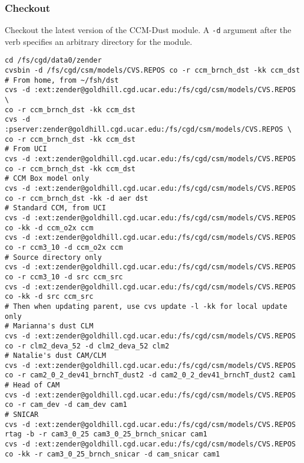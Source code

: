 \documentclass[12pt,twoside]{article}
\begin{document}
\subsubsection[Checkout]{Checkout}
Checkout the latest version of the CCM-Dust module. 
A \verb'-d' argument after the verb specifies an arbitrary directory
for the module.
\begin{verbatim}
cd /fs/cgd/data0/zender
cvsbin -d /fs/cgd/csm/models/CVS.REPOS co -r ccm_brnch_dst -kk ccm_dst
# From home, from ~/fsh/dst 
cvs -d :ext:zender@goldhill.cgd.ucar.edu:/fs/cgd/csm/models/CVS.REPOS \
co -r ccm_brnch_dst -kk ccm_dst
cvs -d :pserver:zender@goldhill.cgd.ucar.edu:/fs/cgd/csm/models/CVS.REPOS \ 
co -r ccm_brnch_dst -kk ccm_dst 
# From UCI
cvs -d :ext:zender@goldhill.cgd.ucar.edu:/fs/cgd/csm/models/CVS.REPOS co -r ccm_brnch_dst -kk ccm_dst 
# CCM Box model only
cvs -d :ext:zender@goldhill.cgd.ucar.edu:/fs/cgd/csm/models/CVS.REPOS co -r ccm_brnch_dst -kk -d aer dst
# Standard CCM, from UCI
cvs -d :ext:zender@goldhill.cgd.ucar.edu:/fs/cgd/csm/models/CVS.REPOS co -kk -d ccm_o2x ccm
cvs -d :ext:zender@goldhill.cgd.ucar.edu:/fs/cgd/csm/models/CVS.REPOS co -r ccm3_10 -d ccm_o2x ccm
# Source directory only 
cvs -d :ext:zender@goldhill.cgd.ucar.edu:/fs/cgd/csm/models/CVS.REPOS co -r ccm3_10 -d src ccm_src
cvs -d :ext:zender@goldhill.cgd.ucar.edu:/fs/cgd/csm/models/CVS.REPOS co -kk -d src ccm_src
# Then when updating parent, use cvs update -l -kk for local update only
# Marianna's dust CLM
cvs -d :ext:zender@goldhill.cgd.ucar.edu:/fs/cgd/csm/models/CVS.REPOS co -r clm2_deva_52 -d clm2_deva_52 clm2
# Natalie's dust CAM/CLM
cvs -d :ext:zender@goldhill.cgd.ucar.edu:/fs/cgd/csm/models/CVS.REPOS co -r cam2_0_2_dev41_brnchT_dust2 -d cam2_0_2_dev41_brnchT_dust2 cam1
# Head of CAM 
cvs -d :ext:zender@goldhill.cgd.ucar.edu:/fs/cgd/csm/models/CVS.REPOS co -r cam_dev -d cam_dev cam1
# SNICAR
cvs -d :ext:zender@goldhill.cgd.ucar.edu:/fs/cgd/csm/models/CVS.REPOS rtag -b -r cam3_0_25 cam3_0_25_brnch_snicar cam1
cvs -d :ext:zender@goldhill.cgd.ucar.edu:/fs/cgd/csm/models/CVS.REPOS co -kk -r cam3_0_25_brnch_snicar -d cam_snicar cam1
\end{verbatim}
\end{document}
